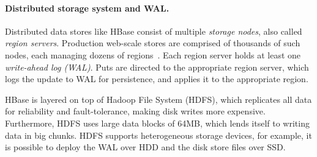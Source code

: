 \paragraph{Distributed storage system and WAL.}
Distributed data stores like HBase consist of multiple \emph{storage nodes}, also called \emph{region servers}.
Production web-scale stores are comprised of thousands of such nodes, each managing
dozens of regions~\cite{hbase,Chang2008}. Each region server holds at least one \emph{write-ahead log (WAL)}. 
Puts are directed to the appropriate region server, which logs the update to WAL for persistence, and 
applies it to the appropriate region. 

HBase is layered on top of Hadoop File System (HDFS), which replicates all data for reliability and fault-tolerance,
making disk writes more expensive. Furthermore, HDFS uses large data blocks of 64MB, which lends itself to writing 
data in big chunks. HDFS supports heterogeneous storage devices, for example, it is possible to deploy the WAL over
HDD and the disk store files over SSD.








